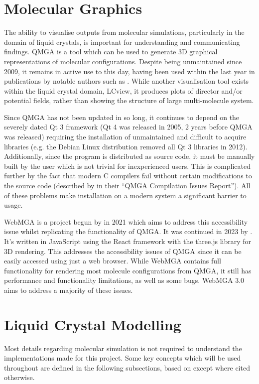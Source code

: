 \section{Molecular Graphics}
The ability to visualise outputs from molecular simulations, particularly in the domain of liquid crystals, is important for understanding and communicating findings. QMGA\cite{gabriel2008molecular} is a tool which can be used to generate 3D graphical representations of molecular configurations. Despite being unmaintained since 2009\cite{qmga_release}, it remains in active use to this day, having been used within the last year in publications by notable authors such as \textcite{ramirez2023densest,mazzilli2023phase}. While another visualisation tool exists within the liquid crystal domain, LCview\cite{james2006finite,LCview}, it produces plots of director and/or potential fields, rather than showing the structure of large multi-molecule system.

Since QMGA has not been updated in so long, it continues to depend on the severely dated Qt 3 framework (Qt 4 was released in 2005, 2 years before QMGA was released) requiring the installation of unmaintained and difficult to acquire libraries (e.g. the Debian Linux distribution removed all Qt 3 libraries in 2012\cite{qt3_removed}). Additionally, since the program is distributed as source code, it must be manually built by the user which is not trivial for inexperienced users. This is complicated further by the fact that modern C compilers fail without certain modifications to the source code (described by \textcite{Battistini_2021} in their ``QMGA Compilation Issues Report''). All of these problems make installation on a modern system a significant barrier to usage.

WebMGA is a project begun by \textcite{Battistini_2021} in 2021 which aims to address this accessibility issue whilst replicating the functionality of QMGA. It was continued in 2023 by \textcite{webmga_2}. It's written in JavaScript using the React\cite{react} framework with the three.js\cite{three} library for 3D rendering. This addresses the accessibility issues of QMGA since it can be easily accessed using just a web browser. While WebMGA contains full functionality for rendering most molecule configurations from QMGA, it still has performance and functionality limitations, as well as some bugs. WebMGA 3.0 aims to address a majority of these issues.

\section{Liquid Crystal Modelling}
Most details regarding molecular simulation is not required to understand the implementations made for this project. Some key concepts which will be used throughout are defined in the following subsections, based on \textcite{allen2017computer} except where cited otherwise.
